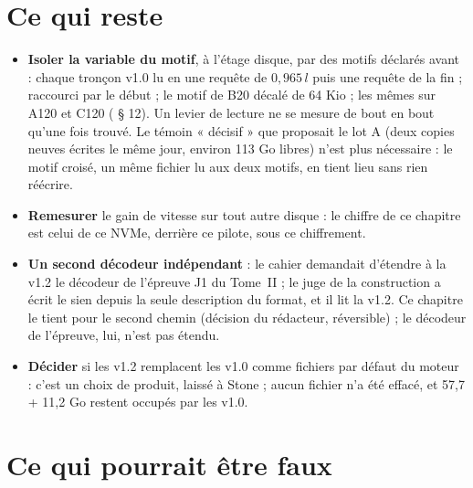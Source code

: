 \section{Ce qui reste}\label{t3cod:sec:reste}

\begin{itemize}
\item \textbf{Isoler la variable du motif}, à l'étage disque, par des motifs déclarés avant : chaque tronçon v1.0 lu en une requête de $0{,}965\,l$ puis une requête de la fin ; raccourci par le début ; le motif de B20 décalé de 64 Kio ; les mêmes sur A120 et C120 ( § 12). Un levier de lecture ne se mesure de bout en bout qu'une fois trouvé. Le témoin « décisif » que proposait le lot A (deux copies neuves écrites le même jour, environ 113 Go libres) n'est plus nécessaire : le motif croisé, un même fichier lu aux deux motifs, en tient lieu sans rien réécrire.
\item \textbf{Remesurer} le gain de vitesse sur tout autre disque : le chiffre de ce chapitre est celui de ce NVMe, derrière ce pilote, sous ce chiffrement.
\item \textbf{Un second décodeur indépendant} : le cahier demandait d'étendre à la v1.2 le décodeur de l'épreuve J1 du Tome~II ; le juge de la construction a écrit le sien depuis la seule description du format, et il lit la v1.2. Ce chapitre le tient pour le second chemin (décision du rédacteur, réversible) ; le décodeur de l'épreuve, lui, n'est pas étendu.
\item \textbf{Décider} si les v1.2 remplacent les v1.0 comme fichiers par défaut du moteur : c'est un choix de produit, laissé à Stone ; aucun fichier n'a été effacé, et 57,7 + 11,2 Go restent occupés par les v1.0.
\end{itemize}

\section{Ce qui pourrait être faux}\label{t3cod:sec:faux}

